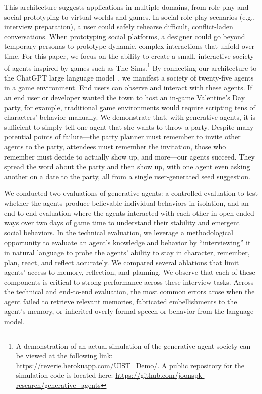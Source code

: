 This architecture suggests applications in multiple domains, from role-play and social prototyping to virtual worlds and games. In social role-play scenarios (e.g., interview preparation), a user could safely rehearse difficult, conflict-laden conversations. When prototyping social platforms, a designer could go beyond temporary personas to prototype dynamic, complex interactions that unfold over time. For this paper, we focus on the ability to create a small, interactive society of agents inspired by games such as The Sims.\footnote{A demonstration of an actual simulation of the generative agent society can be viewed at the following link: \url{https://reverie.herokuapp.com/UIST_Demo/}. A public repository for the simulation code is located here: \url{https://github.com/joonspk-research/generative_agents}} By connecting our architecture to the ChatGPT large language model~\cite{openai_chatgpt}, we manifest a society of twenty-five agents in a game environment. End users can observe and interact with these agents. If an end user or developer wanted the town to host an in-game Valentine's Day party, for example, traditional game environments would require scripting tens of characters' behavior manually. We demonstrate that, with generative agents, it is sufficient to simply tell one agent that she wants to throw a party. Despite many potential points of failure---the party planner must remember to invite other agents to the party, attendees must remember the invitation, those who remember must decide to actually show up, and more---our agents succeed. They spread the word about the party and then show up, with one agent even asking another on a date to the party, all from a single user-generated seed suggestion.

We conducted two evaluations of generative agents: a controlled evaluation to test whether the agents produce believable individual behaviors in isolation, and an end-to-end evaluation where the agents interacted with each other in open-ended ways over two days of game time to understand their stability and emergent social behaviors. In the technical evaluation, we leverage a methodological opportunity to evaluate an agent's knowledge and behavior by ``interviewing'' it in natural language to probe the agents' ability to stay in character, remember, plan, react, and reflect accurately. We compared several ablations that limit agents' access to memory, reflection, and planning. We observe that each of these components is critical to strong performance across these interview tasks. Across the technical and end-to-end evaluation, the most common errors arose when the agent failed to retrieve relevant memories, fabricated embellishments to the agent's memory, or inherited overly formal speech or behavior from the language model.

